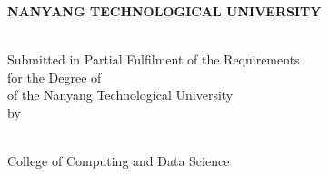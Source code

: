 \makeatletter
\begin{titlepage}
\begin{center}

\uppercase{\textbf{\large{Nanyang Technological University}}}
\\[6cm]

\uppercase{\textbf{\fypcode \\[0.3cm]\@title}}

\vfill

Submitted in Partial Fulfilment of the Requirements\\
for the Degree of \degree\\
of the Nanyang Technological University
\\[0.8cm]
by
\\[0.8cm]

\@author
\\[2cm]

\end{center}

College of Computing and Data Science\\
\@date
\end{titlepage}
\makeatother